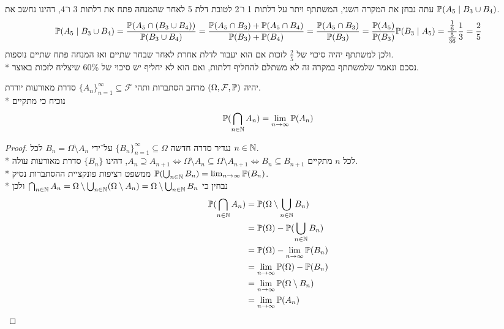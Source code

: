 \begin{solution}
	עתה נבחן את המקרה השני, המשתתף ויתר על דלתות 1 ו־2 לטובת דלת 5 לאחר שהמנחה פתח את דלתות 3 ו־4, דהינו נחשב את $\mathbb{P}(A_5 \mid B_3 \cup B_4)$.
	\[
		\mathbb{P}(A_5 \mid B_3 \cup B_4)
		= \frac{\mathbb{P}(A_5 \cap (B_3 \cup B_4))}{\mathbb{P}(B_3 \cup B_4)}
		= \frac{\mathbb{P}(A_5 \cap B_3) + \mathbb{P}(A_5 \cap B_4)}{\mathbb{P}(B_3) + \mathbb{P}(B_4)}
		= \frac{\mathbb{P}(A_5 \cap B_3)}{\mathbb{P}(B_3)}
		= \frac{\mathbb{P}(A_5)}{\mathbb{P}(B_3)} \mathbb{P}(B_3 \mid A_5)
		= \frac{\frac{1}{6}}{\frac{5}{36}} \frac{1}{3}
		= \frac{2}{5}
	\]
	ולכן למשתתף יהיה סיכוי של $\frac{2}{5}$ לזכות אם הוא יעבור לדלת אחרת לאחר שבחר שתיים ואז המנחה פתח שתיים נוספות. \\*
	נסכם ונאמר שלמשתתף במקרה זה לא משתלם להחליף דלתות, ואם הוא לא יחליף יש סיכוי של 60\% שיצליח לזכות באוצר.
\end{solution}

\Question{}
יהיה $(\Omega, \mathcal{F}, \mathbb{P})$ מרחב הסתברות ותהי ${\{A_n\}}_{n = 1}^\infty \subseteq \mathcal{F}$ סדרת מאורעות יורדת. \\*
נוכיח כי מתקיים
\[
	\mathbb{P}(\bigcap_{n \in \mathbb{N}} A_n) = \lim_{n \to \infty} \mathbb{P}(A_n)
\]
\begin{proof}
	נגדיר סדרה חדשה ${\{B_n\}}_{n = 1}^\infty \subseteq \Omega$ על־ידי $B_n = \Omega \setminus A_n$ לכל $n \in \mathbb{N}$. \\*
	לכל $n$ מתקיים $A_n \supseteq A_{n + 1} \iff \Omega \setminus A_n \subseteq \Omega \setminus A_{n + 1} \iff B_n \subseteq B_{n + 1}$, דהינו $\{B_n\}$ סדרת מאורעות עולה. \\*
	ממשפט רציפות פונקציית ההסתברות נסיק $\mathbb{P}(\bigcup_{n \in \mathbb{N}} B_n) = \lim_{n \to \infty} \mathbb{P}(B_n)$. \\*
	נבחין כי $\bigcap_{n \in \mathbb{N}} A_n = \Omega \setminus \bigcup_{n \in \mathbb{N}} (\Omega \setminus A_n) = \Omega \setminus \bigcup_{n \in \mathbb{N}} B_n$ ולכן
	\begin{align*}
		\mathbb{P}(\bigcap_{n \in \mathbb{N}} A_n)
		& = \mathbb{P}(\Omega \setminus \bigcup_{n \in \mathbb{N}} B_n) \\
		& = \mathbb{P}(\Omega) - \mathbb{P}(\bigcup_{n \in \mathbb{N}} B_n) \\
		& = \mathbb{P}(\Omega) - \lim_{n \to \infty} \mathbb{P}(B_n) \\
		& = \lim_{n \to \infty} \mathbb{P}(\Omega) - \mathbb{P}(B_n) \\
		& = \lim_{n \to \infty} \mathbb{P}(\Omega \setminus B_n) \\
		& = \lim_{n \to \infty} \mathbb{P}(A_n)
	\end{align*}
\end{proof}


